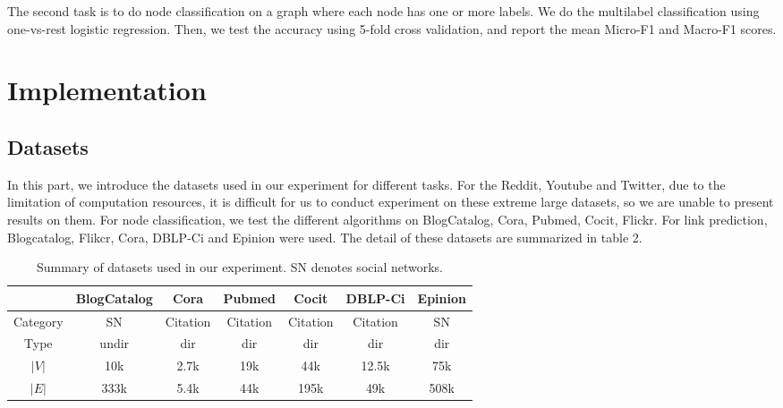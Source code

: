 \documentclass[a4paper]{article}
\begin{document}
\noindent The second task is to do node classification on a graph where each node has one or more labels. We do the multilabel classification using one-vs-rest logistic regression. Then, we test the accuracy using 5-fold cross validation, and report the mean Micro-F1 and Macro-F1 scores.


\section{Implementation}

\subsection{Datasets}
\noindent In this part, we introduce the datasets used in our experiment for different tasks. For the Reddit, Youtube and Twitter, due to the limitation of computation resources, it is difficult for us to conduct experiment on these extreme large datasets, so we are unable to present results on them. For node classification, we test the different algorithms on BlogCatalog, Cora, Pubmed, Cocit, Flickr. For link prediction, Blogcatalog, Flikcr, Cora, DBLP-Ci and Epinion were used. The detail of these datasets are summarized in table 2.
\begin{table}[H]
    \centering
\begin{tabular}{c|c|c|c|c|c|c}
\toprule  
& BlogCatalog& Cora & Pubmed& Cocit &DBLP-Ci &Epinion\\
\midrule  
Category & SN& Citation&Citation&Citation&Citation &SN\\
Type& undir& dir & dir & dir & dir & dir\\
$|V|$ &10k &2.7k &19k &44k &12.5k & 75k\\
$|E|$ &333k & 5.4k &44k & 195k &49k &508k\\
\bottomrule 
\end{tabular}
\caption{Summary of datasets used in our experiment. SN denotes social networks.}
\end{table}
\end{document}

